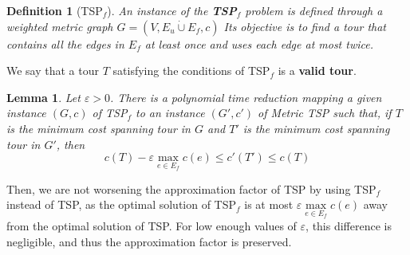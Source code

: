 \documentclass[12pt]{article}
\newtheorem{definition}{Definition}
\newtheorem{lemma}{Lemma}
\begin{document}
\begin{definition}[TSP$_f$]
    An instance of the \textbf{TSP$_f$} problem is defined through a weighted metric graph $G = (V, E_u\dot\cup E_f, c)$ 
    Its objective is to find a tour that contains all the edges in $E_f$ at least once and uses each edge at most twice. 
\end{definition}
We say that a tour $T$ satisfying the conditions of TSP$_f$ is a \textbf{valid tour}.
\begin{lemma}
    Let $\varepsilon>0$. There is a polynomial time reduction mapping a given instance $(G,c)$ of TSP$_f$ to an instance $(G',c')$ of Metric TSP such that, if $T$ is the minimum cost spanning tour in $G$ and $T'$ is the minimum cost spanning tour in $G'$, then 
    \[c(T) -\varepsilon \max\limits_{e \in E_f} c(e) \leq c'(T')\leq c(T)\]
\end{lemma}
Then, we are not worsening the approximation factor of TSP by using TSP$_f$ instead of TSP, as the optimal solution of TSP$_f$ is at most $\varepsilon \max\limits_{e \in E_f} c(e)$ away from the optimal solution of TSP\@.
For low enough values of $\varepsilon$, this difference is negligible, and thus the approximation factor is preserved.
\end{document}
